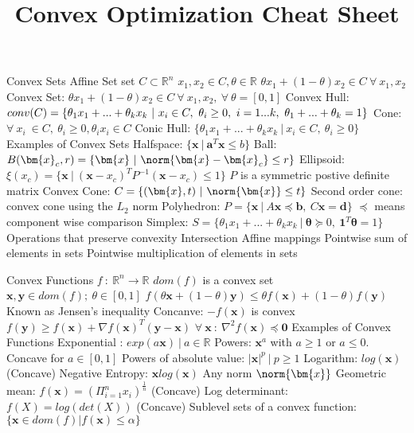 \documentclass[14pt]{extarticle}
\title{Convex Optimization Cheat Sheet}
\begin{document}
	\maketitle
	

	\begin{outline}		
		\1	Convex Sets
			\2	Affine Set
				\3	set $C \subset \mathbb{R}^n$
				\3	$x_1,x_2 \in C, \theta \in \mathbb{R}$
				\3	$\theta x_1 + (1 - \theta)x_2 \in C~\forall~x_1,x_2$
			\2	Convex Set: $\theta x_1 + (1 - \theta)x_2 \in C~\forall~x_1,x_2,~\forall~\theta = [0,1]$
			\2	Convex Hull: $conv(C) = \{\theta_1 x_1 + ... + \theta_kx_k~|~x_i \in C,\\~\theta_i \ge 0,~i=1...k,~\theta_1 + ... + \theta_k = 1\}$
			\2	Cone: $\forall~x_i~\in C,~\theta_i \ge 0,\theta_i x_i \in C$
				\3	Conic Hull: $\{\theta_1x_1 + ... + \theta_kx_k~|~x_i \in C,~\theta_i \ge 0\}$
			\2	Examples of Convex Sets
				\3	Halfspace: $\{\bm{x}~|~\bm{a}^T \bm{x} \le b\}$
				\3	Ball: $B(\bm{x}_c,r) = \{\bm{x}~|~\norm{\bm{x} - \bm{x}_c} \le r\}$
				\3	Ellipsoid:	$\xi(x_c) = \{\bm{x}~|~(\bm{x} - x_c)^T P^{-1}(\bm{x} - x_c) \le 1\}$
					\4	$P$ is a symmetric postive definite matrix
				\3	Convex Cone:	$C = \{(\bm{x},t)~|~\norm{\bm{x}} \le t\}$
					\4	Second order cone:  convex cone using the $L_2$ norm
				\3	Polyhedron: $P = \{\bm{x}~|~A\bm{x} \preceq \bm{b},~C\bm{x} = \bm{d}\}$
					\4	$\preceq$ means component wise comparison
				\3	Simplex: $S = \{\theta_1 x_1 + ... + \theta_kx_k~|~\bm{\theta} \succeq 0,~\bm{1}^T\bm{\theta} = 1\}$
			\2	Operations that preserve convexity
				\3	Intersection
				\3	Affine mappings
				\3	Pointwise sum of elements in sets
				\3	Pointwise multiplication of elements in sets	
		
		\1	Convex Functions
			\2	$f~:~\mathbb{R}^n \rightarrow \mathbb{R}$ 
				\3	$dom(f)$ is a convex set
				\3	$\bm{x},\bm{y} \in dom(f);~\theta \in [0,1]$
				\3	$f(\theta \bm{x} + (1 - \theta)\bm{y}) \le \theta f(\bm{x}) + (1 - \theta)f(\bm{y})$
					\4	Known as Jensen's inequality
			\2	Concanve: $-f(\bm{x})$ is convex
			\2	$f(\bm{y}) \ge f(\bm{x}) + \nabla f(\bm{x})^T(\bm{y} - \bm{x})$
			\2	$\forall~\bm{x}~:~\nabla^2f(\bm{x}) \preceq \bm{0}$
			\2	Examples of Convex Functions
				\3	Exponential : $exp(a\bm{x})~|~a \in \mathbb{R}$ 
				\3	Powers:	$\bm{x}^a$ with $a \ge 1$ or $a \le 0$.  Concave for $a \in [0,1]$
				\3	Powers of absolute value: $|\bm{x}|^p~|~p \ge 1$ 
				\3	Logarithm: $log(\bm{x})$ (Concave)
				\3	Negative Entropy:	$\bm{x} log(\bm{x})$
				\3	Any norm $\norm{\bm{x}}$
				\3	Geometric mean:	$f(\bm{x}) = (\Pi_{i=1}^n x_i)^{\frac{1}{n}}$ (Concave)
				\3	Log determinant:	$f(X) = log(det(X))$ (Concave)
				\3	Sublevel sets of a convex function: $\{\bm{x} \in dom(f) | f(\bm{x}) \le \alpha\}$
			

\end{outline}
\end{document}
